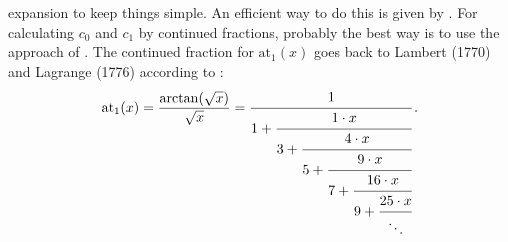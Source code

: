 \documentclass{article}
\begin{document}
expansion to keep things simple. An efficient way to do this is given by
\citep{1985CeMec..35..129S}. For calculating $c_0$ and $c_1$ by continued fractions,
probably the best way is to use the approach of \citet{cont_frac1987}. The
continued fraction for $\text{at}_1(x)$ goes back to Lambert (1770) and Lagrange (1776)
according to \citet[][Appendix II, formula 14]{1963cf..book.....O}:
\begin{equation}
\text{at}_1(x) = \frac{\arctan(\sqrt{x})}{\sqrt{x}} =
\cfrac{1}{1+\cfrac{1\cdot x}
	 {3+\cfrac{4\cdot x}
         {5+\cfrac{9\cdot x}
	 {7+\cfrac{16\cdot x}
	 {9+\cfrac{25\cdot x}{\ddots}}}}}}\,.
\end{equation}
%


\end{document}
